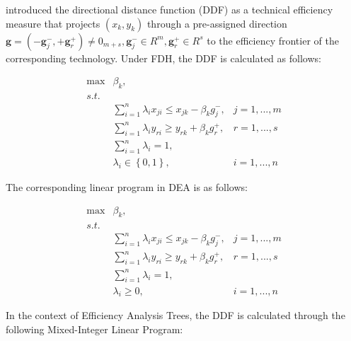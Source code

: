 \citet{chambers1998} introduced the directional distance function (DDF)
as a technical efficiency measure that projects
\((\textit{x}_k, \textit{y}_k)\) through a pre-assigned direction
\(\textbf{g}=(-\textbf{g}_{j}^{-},+\textbf{g}_{r}^{+}) \ne 0_{m+s}, \textbf{g}_{j}^{-} \in R^{m}, \textbf{g}_{r}^{+} \in R^{s}\)
to the efficiency frontier of the corresponding technology. Under FDH,
the DDF is calculated as follows:

\begin{equation} \label{(27)} 
\begin{array}{lllll} 
{} & {\max } & {\beta_{k}, } & {} & {} \\ 
{} & {s.t.} & {} & {} & {} \\ 
{} & {} & {\sum_{i=1}^{n}\lambda_{i} x_{ji}  \le x_{jk} -\beta_{k} g_{j}^{-} ,} & {j=1,...,m} & {} \\ 
{} & {} & {\sum_{i=1}^{n}\lambda_{i} y_{ri}  \ge y_{rk} +\beta_{k} g_{r}^{+} ,} & {r=1,...,s} & {} \\ 
{} & {} & {\sum_{i=1}^{n}\lambda _{i}  =1,} & {} & {} \\ 
{} & {} & {\lambda _{i} \in \left\{0,1\right\},} & {i=1,...,n} & {} 
\end{array} 
\end{equation}

The corresponding linear program in DEA is as follows:

\begin{equation} \label{(28)} 
\begin{array}{lllll} 
{} & {\max } & {\beta_{k}, } & {} & {} \\ 
{} & {s.t.} & {} & {} & {} \\ 
{} & {} & {\sum_{i=1}^{n}\lambda_{i} x_{ji} \le x_{jk} -\beta_{k} g_{j}^{-} ,} & {j=1,...,m} & {} \\ 
{} & {} & {\sum_{i=1}^{n}\lambda_{i} y_{ri}  \ge y_{rk} +\beta_{k} g_{r}^{+} ,} & {r=1,...,s} & {} \\ 
{} & {} & {\sum_{i=1}^{n}\lambda_{i}=1,} & {} & {} \\ 
{} & {} & {\lambda_{i} \ge 0,} & {i=1,...,n} & {} 
\end{array} 
\end{equation}

In the context of Efficiency Analysis Trees, the DDF is calculated
through the following Mixed-Integer Linear Program:

